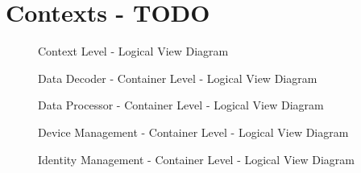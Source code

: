 \chapter{Contexts - TODO}
\label{AppendixH}

\begin{landscape}
    \begin{figure}[H]
       \centering
    \resizebox{\columnwidth}{!}
    {      
       
    }
    \caption[Context Level - Logical View Diagram]{Context Level - Logical View Diagram}
       \label{fig:AppendixH:contexts}
    \end{figure}
\end{landscape}

\begin{figure}[H]
    \centering
    \resizebox{\columnwidth}{!}
        {      
        
        }
    \caption[Data Decoder - Container Level - Logical View Diagram]{Data Decoder - Container Level - Logical View Diagram}
    \label{fig:AppendixH:decoder}
\end{figure}

\begin{figure}[H]
    \centering
    \resizebox{\columnwidth}{!}
        {      
        
        }
    \caption[Data Processor - Container Level - Logical View Diagram]{Data Processor - Container Level - Logical View Diagram}
    \label{fig:AppendixH:processor}
\end{figure}

\begin{figure}[H]
    \centering
    \resizebox{\columnwidth}{!}
        {      
        
        }
    \caption[Device Management - Container Level - Logical View Diagram]{Device Management - Container Level - Logical View Diagram}
    \label{fig:AppendixH:device}
\end{figure}

\begin{figure}[H]
    \centering
    \resizebox{\columnwidth}{!}
        {      
        
        }
    \caption[Identity Management - Container Level - Logical View Diagram]{Identity Management - Container Level - Logical View Diagram}
    \label{fig:AppendixH:identity}
\end{figure}

